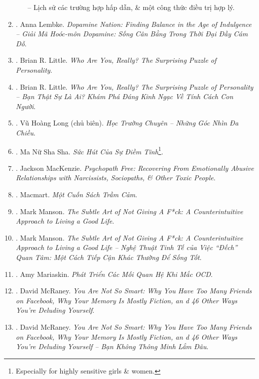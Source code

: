 \documentclass{article}
\begin{document}
\begin{enumerate}
\begin{itemize}
		-- Lịch sử các trường hợp hấp dẫn, \& một công thức điều trị hợp lý.
	\end{itemize}	
	\item \cite{Lembke_dopamine_VN}. {\sc Anna Lembke}. {\it Dopamine Nation: Finding Balance in the Age of Indulgence -- Giải Mã Hoóc-môn Dopamine: Sống Cân Bằng Trong Thời Đại Đầy Cám Dỗ}.\hfill{\sf[done]}
	\item \cite{Little_personality}. {\sc Brian R. Little}. {\it Who Are You, Really? The Surprising Puzzle of Personality}.\hfill{\sf[done]}
	\item \cite{Little_personality_VN}. {\sc Brian R. Little}. {\it Who Are You, Really? The Surprising Puzzle of Personality -- Bạn Thật Sự Là Ai? Khám Phá Đáng Kinh Ngạc Về Tính Cách Con Người}.\hfill{\sf[done]}
	\item \cite{Long2021}. Vũ Hoàng Long (chủ biên). {\it Học Trường Chuyên -- Những Góc Nhìn Đa Chiều}.\hfill{\sf[done]}
	\item \cite{MNSS_calm}. Ma Nữ Sha Sha. {\it Sức Hút Của Sự Điềm Tĩnh}\footnote{Especially for highly sensitive girls \& women.}.\hfill{\sf[done]}
	\item \cite{MacKenzie2015}. Jackson MacKenzie. {\it Psychopath Free: Recovering From Emotionally Abusive Relationships with Narcissists, Sociopaths, \& Other Toxic People}.\hfill{\sf[done]}
	\item \cite{Macmart_depress}. Macmart. {\it Một Cuốn Sách Trầm Cảm}.\hfill{\sf[reading]}
	\item \cite{Manson_giving_fuck}. Mark Manson. {\it The Subtle Art of Not Giving A F*ck: A Counterintuitive Approach to Living a Good Life}.\hfill{\sf[reading]}
	\item \cite{Manson_giving_fuck_vn}. Mark Manson. {\it The Subtle Art of Not Giving A F*ck: A Counterintuitive Approach to Living a Good Life -- Nghệ Thuật Tinh Tế của Việc ``Đếch'' Quan Tâm: Một Cách Tiếp Cận Khác Thường Để Sống Tốt}.\hfill{\sf[done]}
	\item \cite{Mariaskin_OCD}. Amy Mariaskin. {\it Phát Triển Các Mối Quan Hệ Khi Mắc OCD}.\hfill{\sf[done]}
	\item \cite{McRaney_not_smart}. {\sc David McRaney}. {\it You Are Not So Smart: Why You Have Too Many Friends on Facebook, Why Your Memory Is Mostly Fiction, an d 46 Other Ways You're Deluding Yourself}.
	\item \cite{McRaney_not_smart_VN}. {\sc David McRaney}. {\it You Are Not So Smart: Why You Have Too Many Friends on Facebook, Why Your Memory Is Mostly Fiction, an d 46 Other Ways You're Deluding Yourself -- Bạn Không Thông Minh Lắm Đâu}.\hfill{\sf[done]}

\end{enumerate}
\end{document}
